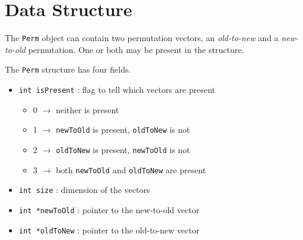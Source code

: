 \par
\section{Data Structure}
\label{section:Perm:dataStructure}
\par
The {\tt Perm} object can contain two permutation vectors,
an {\it old-to-new} and a {\it new-to-old} permutation.
One or both may be present in the structure.
\par
The {\tt Perm} structure has four fields.
\begin{itemize}
\item {\tt int isPresent} : flag to tell which vectors are present 
\begin{itemize}
\item 0 $\longrightarrow$ neither is present 
\item 1 $\longrightarrow$ {\tt newToOld} is present, {\tt oldToNew} is not
\item 2 $\longrightarrow$ {\tt oldToNew} is present, {\tt newToOld} is not
\item 3 $\longrightarrow$ both {\tt newToOld} and {\tt oldToNew} are present 
\end{itemize}
\item {\tt int size} : dimension of the vectors 
\item {\tt int *newToOld} : pointer to the new-to-old vector 
\item {\tt int *oldToNew} : pointer to the old-to-new vector 
\end{itemize}
